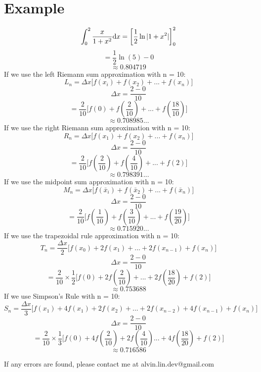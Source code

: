 \documentclass[letterpaper, 12pt]{math}
\begin{document}
\section*{Example}
\[ \int_{0}^{2}{\frac{x}{1+x^{2}}\mathrm{d}{x}} =
   \bigg[\frac{1}{2}\ln|1+x^{2}|\bigg]_{0}^{2} \]
\[ = \frac{1}{2}\ln(5)-0 \]
\[ \approx 0.804719 \]
If we use the left Riemann sum approximation with n = 10:
\[ L_{n} = \Delta x\bigg[f(x_{i})+f(x_{2})+...+f(x_{n})\bigg] \]
\[ \Delta x = \frac{2-0}{10} \]
\[ = \frac{2}{10}\bigg[f(0)+f(\frac{2}{10})+...+f(\frac{18}{10})\bigg] \]
\[ \approx 0.708985... \]
If we use the right Riemann sum approximation with n = 10:
\[ R_{n} = \Delta x\bigg[f(x_{1})+f(x_{2})+...+f(x_{n})\bigg] \]
\[ \Delta x = \frac{2-0}{10} \]
\[ = \frac{2}{10}\bigg[f(\frac{2}{10})+f(\frac{4}{10})+...+f(2)\bigg] \]
\[ \approx 0.798391... \]
If we use the midpoint sum approximation with n = 10:
\[ M_{n} = \Delta x\bigg[
   f(\bar{x}_{i})+f(\bar{x}_{2})+...+f(\bar{x}_{n})\bigg] \]
\[ \Delta x = \frac{2-0}{10} \]
\[ = \frac{2}{10}\bigg[
   f(\frac{1}{10})+f(\frac{3}{10})+...+f(\frac{19}{20})\bigg] \]
\[ \approx 0.715920... \]
If we use the trapezoidal rule approximation with n = 10:
\[ T_{n} = \frac{\Delta x}{2}\bigg[
   f(x_{0})+2f(x_{1})+...+2f(x_{n-1})+f(x_{n})\bigg] \]
\[ \Delta x = \frac{2-0}{10} \]
\[ = \frac{2}{10}\times\frac{1}{2}\bigg[
   f(0)+2f(\frac{2}{10})+...+2f(\frac{18}{20})+f(2)\bigg] \]
\[ \approx 0.753688 \]
If we use Simpson's Rule with n = 10:
\[ S_{n} = \frac{\Delta x}{3}\bigg[
   f(x_{1})+4f(x_{1})+2f(x_{2})+...+2f(x_{n-2})+4f(x_{n-1})+f(x_{n})\bigg] \]
\[ \Delta x = \frac{2-0}{10} \]
\[ = \frac{2}{10}\times\frac{1}{3}\bigg[
   f(0)+4f(\frac{2}{10})+2f(\frac{4}{10})...+4f(\frac{18}{20})+f(2)\bigg] \]
\[ \approx 0.716586 \]

\begin{center}
  If any errors are found, please contact me at alvin.lin.dev@gmail.com
\end{center}
\end{document}
